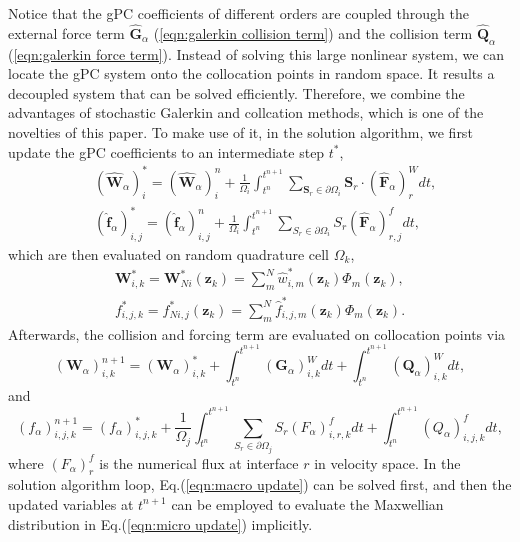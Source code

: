 \documentclass[preprint,3p,12pt,sort&compress]{elsarticle}
\begin{document}
Notice that the gPC coefficients of different orders are coupled through the external force term $\hat{\boldsymbol G}_\alpha$ (\ref{eqn:galerkin collision term}) and the collision term $\hat{\boldsymbol Q}_\alpha$ (\ref{eqn:galerkin force term}). Instead of solving this large nonlinear system, we can locate the gPC system onto the collocation points in random space.
It results a decoupled system that can be solved efficiently.
Therefore, we combine the advantages of stochastic Galerkin and collcation methods, which is one of the novelties of this paper.
To make use of it, in the solution algorithm, we first update the gPC coefficients to an intermediate step $t^*$,
\begin{equation}
\begin{aligned}
&(\hat {\boldsymbol{W}}_\alpha)_{i}^{*}
=(\hat {\boldsymbol{W}}_\alpha)_{i}^n+\frac{1}{\Omega_{i}}\int_{t^n}^{t^{n+1}}\sum_{\mathbf S_{r} \in \partial \Omega_{i}} \mathbf{S}_{r} \cdot (\hat{\boldsymbol{F}}_{\alpha})_{r}^{W} dt, \\
&(\hat {\boldsymbol f}_\alpha)_{i,j}^{*}
=(\hat {\boldsymbol f}_\alpha)_{i,j}^n+\frac{1}{\Omega_{i}}\int_{t^n}^{t^{n+1}} \sum_{S_{r} \in \partial \Omega_{i}} S_r (\hat {\boldsymbol F}_\alpha)_{r,j}^f dt,
\end{aligned}
\end{equation}
which are then evaluated on random quadrature cell $\Omega_{k}$,
\begin{equation}
\begin{aligned}
\mathbf W_{i, k}^{*}=\mathbf W_{N i}^{*}\left(\mathbf z_{k}\right)=\sum_{m}^{N} \hat{w}_{i, m}^{*}\left(\mathbf z_{k}\right) \Phi_{m}\left(\mathbf z_{k}\right), \\
f_{i, j, k}^{*}=f_{N i, j}^{*}\left(\mathbf z_{k}\right)=\sum_{m}^{N} \hat{f}_{i, j, m}^{*}\left(\mathbf z_{k}\right) \Phi_{m}\left(\mathbf z_{k}\right).
\end{aligned}
\end{equation}
Afterwards, the collision and forcing term are evaluated on collocation points via
\begin{equation}
\left(\mathbf{W}_{\alpha}\right)_{i,k}^{n+1}
=\left(\mathbf{W}_{\alpha}\right)_{i,k}^{*}
+\int_{t^{n}}^{t^{n+1}}\left(\mathbf{G}_{\alpha}\right)_{i,k}^{W} d t
+\int_{t^{n}}^{t^{n+1}}\left(\mathbf{Q}_{\alpha}\right)_{i,k}^{W} d t,
\label{eqn:macro update}
\end{equation}
and
\begin{equation}
\left(f_{\alpha}\right)_{i, j, k}^{n+1}
=\left(f_{\alpha}\right)_{i, j, k}^{*}
+\frac{1}{\Omega_{j}} \int_{t^{n}}^{t^{n+1}} \sum_{S_{r} \in \partial \Omega_{j}} S_{r}\left(F_{\alpha}\right)_{i,r,k}^{f} d t
+\int_{t^{n}}^{t^{n+1}}\left(Q_{\alpha}\right)_{i, j, k}^{f} d t,
\label{eqn:micro update}
\end{equation}
where $(F_\alpha)^f_r$ is the numerical flux at interface $r$ in velocity space.
In the solution algorithm loop, Eq.(\ref{eqn:macro update}) can be solved first, and then the updated variables at $t^{n+1}$ can be employed to evaluate the Maxwellian distribution in Eq.(\ref{eqn:micro update}) implicitly. 
\end{document}
